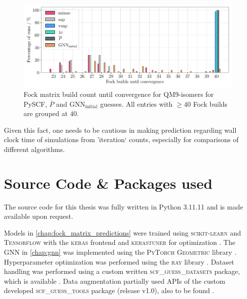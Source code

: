 \begin{figure}[H]
    \centering
    \includegraphics[width=\textwidth]{../fig/gnn/SO_0D_GNN_model_fock_build_count_bar.pdf}
    \caption[Fock matrix build count until convergence QM9-isomers]{Fock matrix build count until convergence for QM9-isomers for PySCF, $\overline{P}$ and GNN$_\text{initial}$ guesses. All entries with $\geq 40$ Fock builds are grouped at $40$.}
    \label{fig:so_fock_build_iterations}
\end{figure}
Given this fact, one needs to be cautious in making prediction regarding wall clock time of simulations from 'iteration` counts, especially for comparisons of different algorithms.

\section{Source Code \& Packages used}
\label{sec:source_code_packages}
The source code for this thesis was fully written in Python 3.11.11 \parencite{ref:python} and is made available upon request.

Models in \autoref{chap:fock_matrix_predictions} were trained using \textsc{scikit-learn} \parencite{ref:sk-learn} and \textsc{Tensorflow} \parencite{ref:tensorflow} with the \textsc{keras} frontend \parencite{ref:keras} and \textsc{kerastuner} for optimization \parencite{ref:kerastuner}. The GNN in \autoref{chap:gnn} was implemented using the \textsc{PyTorch Geometric} library \parencite{ref:PyTorchGeometric}. Hyperparameter optimization was performed using the \textsc{ray} library \parencite{ref:ray_tune}. Dataset handling was performed using a custom written \textsc{scf\_guess\_datasets} package, which is available  \parencite{ref:milacher_scf_guess_datasets}. Data augmentation partially used APIs of the custom developed \textsc{scf\_guess\_tools} package (release v1.0), also to be found  \parencite{ref:scf_guess_tools}. 
